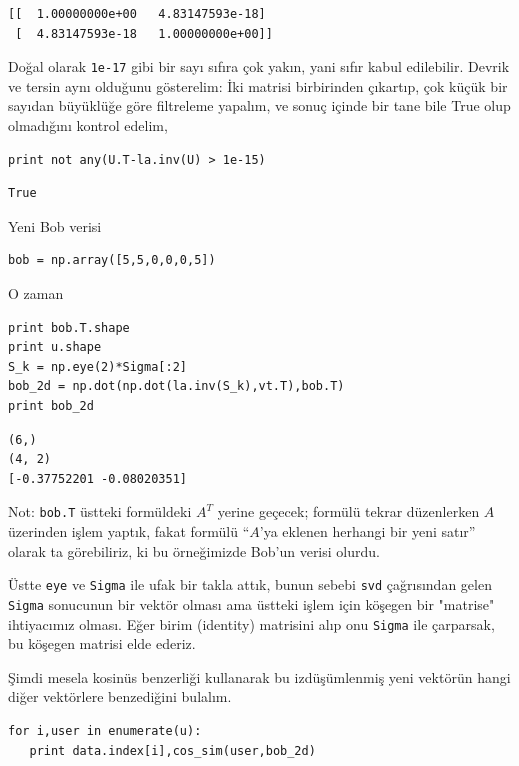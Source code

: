 \documentclass[12pt,fleqn]{article}\usepackage{../../common}
\begin{document}
\begin{verbatim}
[[  1.00000000e+00   4.83147593e-18]
 [  4.83147593e-18   1.00000000e+00]]
\end{verbatim}

Doğal olarak \verb!1e-17! gibi bir sayı sıfıra çok yakın, yani sıfır kabul
edilebilir. Devrik ve tersin aynı olduğunu gösterelim: İki matrisi birbirinden
çıkartıp, çok küçük bir sayıdan büyüklüğe göre filtreleme yapalım, ve sonuç
içinde bir tane bile True olup olmadığını kontrol edelim,

\begin{verbatim}
print not any(U.T-la.inv(U) > 1e-15)
\end{verbatim}

\begin{verbatim}
True
\end{verbatim}

Yeni Bob verisi 

\begin{verbatim}
bob = np.array([5,5,0,0,0,5]) 
\end{verbatim}

O zaman 

\begin{verbatim}
print bob.T.shape
print u.shape
S_k = np.eye(2)*Sigma[:2]
bob_2d = np.dot(np.dot(la.inv(S_k),vt.T),bob.T)
print bob_2d
\end{verbatim}

\begin{verbatim}
(6,)
(4, 2)
[-0.37752201 -0.08020351]
\end{verbatim}

Not: \verb!bob.T! üstteki formüldeki $A^T$ yerine geçecek; formülü tekrar
düzenlerken $A$ üzerinden işlem yaptık, fakat formülü ``$A$'ya eklenen
herhangi bir yeni satır'' olarak ta görebiliriz, ki bu örneğimizde Bob'un
verisi olurdu. 

Üstte \verb!eye! ve \verb!Sigma! ile ufak bir takla attık, bunun sebebi
\verb!svd! çağrısından gelen \verb!Sigma!  sonucunun bir vektör olması ama
üstteki işlem için köşegen bir "matrise" ihtiyacımız olması. Eğer birim
(identity) matrisini alıp onu \verb!Sigma! ile çarparsak, bu köşegen
matrisi elde ederiz.

Şimdi mesela kosinüs benzerliği kullanarak bu izdüşümlenmiş yeni
vektörün hangi diğer vektörlere benzediğini bulalım.

\begin{verbatim}
for i,user in enumerate(u):
   print data.index[i],cos_sim(user,bob_2d)
\end{verbatim}
\end{document}

